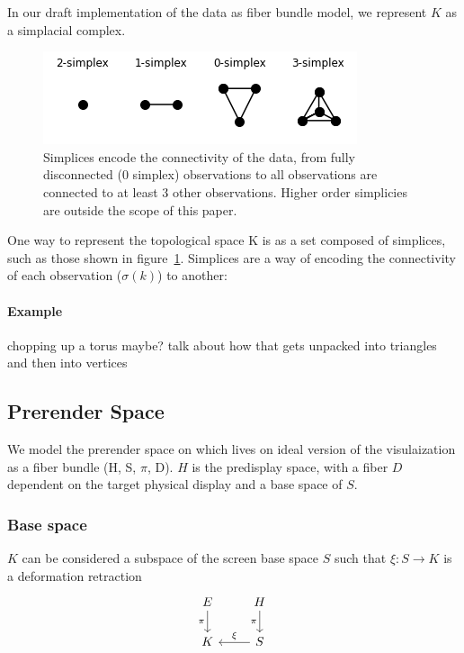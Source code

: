 \documentclass[../main.tex]{subfiles}
\begin{document}
In our draft implementation of the data as fiber bundle model, we represent $K$ as a simplacial complex. 

\begin{figure}[H]
    \label{fig:simplex}
    \includegraphics{figures/sections/math/simplex.png}
    \caption{Simplices encode the connectivity of the data, from fully disconnected (0 simplex) observations to all observations are connected to at least 3 other observations. Higher order simplicies are outside the scope of this paper.}
\end{figure}

One way to represent the topological space K is as a set composed of simplices, such as those shown in figure~\ref{fig:simplex}. Simplices are a way of encoding the connectivity of each observation ($\sigma(k)$) to another: %

\paragraph{Example}
chopping up a torus maybe? talk about how that gets unpacked into triangles and then into vertices


\subsection{Prerender Space}
\label{sec:display}


We model the prerender space on which lives on ideal version of the visulaization as a fiber bundle (H, S, $\pi$, D). $H$ is the predisplay space, with a fiber $D$ dependent on the target physical display and a base space of $S$. 

\subsubsection{Base space}
$K$ can be considered a subspace of the screen base space $S$ such that $\xi: S \rightarrow K$ is a deformation retraction \cite{RetractionTopology2020}
\begin{equation}
    \begin{tikzcd}
        E \arrow[d, "\pi"'] & H \arrow[d, "\pi"'] \\
        K                   & S \arrow[l, "\xi"']
        \end{tikzcd}
\end{equation}
\end{document}
